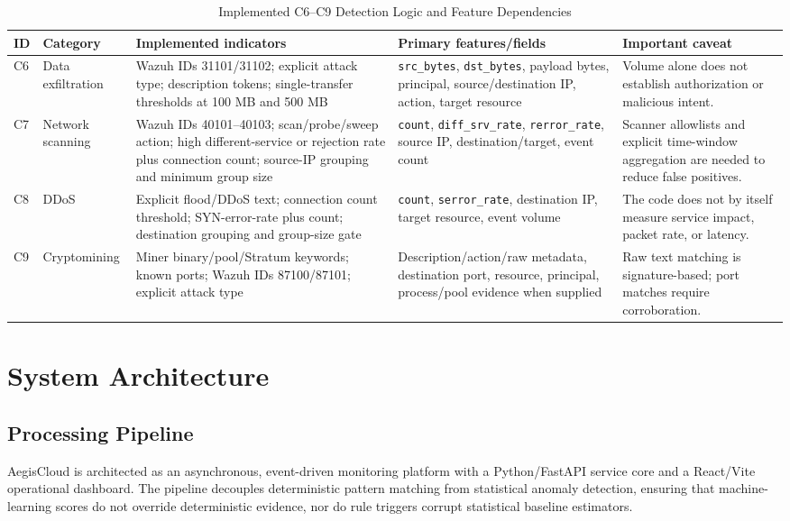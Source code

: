 \documentclass[conference]{IEEEtran}
\begin{document}
\begin{table}[t]
\centering
\caption{Implemented C6--C9 Detection Logic and Feature Dependencies}
\label{tab:c6c9}
\scriptsize
\begin{tabular}{p{0.7cm}p{2.4cm}p{4.5cm}p{4.5cm}p{2.0cm}}
\toprule
\textbf{ID} & \textbf{Category} & \textbf{Implemented indicators} & \textbf{Primary features/fields} & \textbf{Important caveat}\\
\midrule
C6 & Data exfiltration & Wazuh IDs 31101/31102; explicit attack type; description tokens; single-transfer thresholds at 100 MB and 500 MB & \texttt{src\_bytes}, \texttt{dst\_bytes}, payload bytes, principal, source/destination IP, action, target resource & Volume alone does not establish authorization or malicious intent.\\
C7 & Network scanning & Wazuh IDs 40101--40103; scan/probe/sweep action; high different-service or rejection rate plus connection count; source-IP grouping and minimum group size & \texttt{count}, \texttt{diff\_srv\_rate}, \texttt{rerror\_rate}, source IP, destination/target, event count & Scanner allowlists and explicit time-window aggregation are needed to reduce false positives.\\
C8 & DDoS & Explicit flood/DDoS text; connection count threshold; SYN-error-rate plus count; destination grouping and group-size gate & \texttt{count}, \texttt{serror\_rate}, destination IP, target resource, event volume & The code does not by itself measure service impact, packet rate, or latency.\\
C9 & Cryptomining & Miner binary/pool/Stratum keywords; known ports; Wazuh IDs 87100/87101; explicit attack type & Description/action/raw metadata, destination port, resource, principal, process/pool evidence when supplied & Raw text matching is signature-based; port matches require corroboration.\\
\bottomrule
\end{tabular}
\end{table}

\section{System Architecture}
\subsection{Processing Pipeline}
AegisCloud is architected as an asynchronous, event-driven monitoring platform with a Python/FastAPI service core and a React/Vite operational dashboard. The pipeline decouples deterministic pattern matching from statistical anomaly detection, ensuring that machine-learning scores do not override deterministic evidence, nor do rule triggers corrupt statistical baseline estimators.
\end{document}
